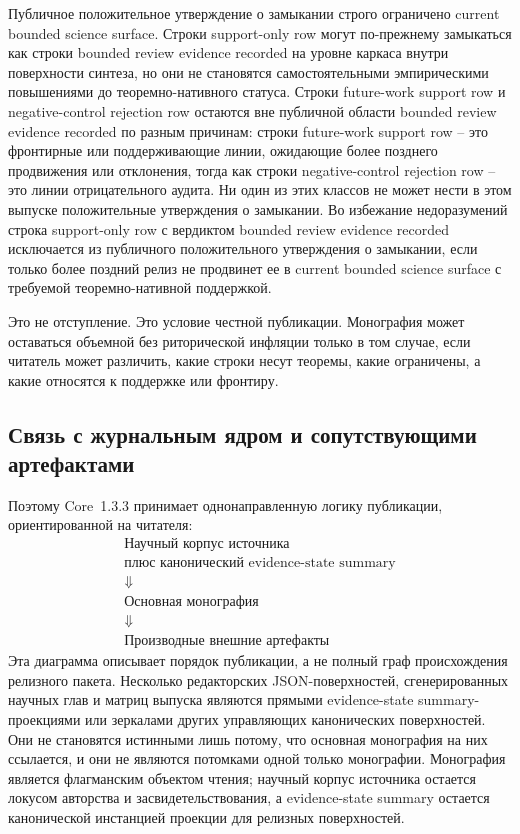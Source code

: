 Публичное положительное утверждение о замыкании строго ограничено
current bounded science surface. Строки support-only row могут по-прежнему
замыкаться как строки bounded review evidence recorded на уровне каркаса внутри поверхности синтеза, но
они не становятся самостоятельными эмпирическими повышениями до
теоремно-нативного статуса. Строки future-work support row и negative-control rejection row
остаются вне публичной области bounded review evidence recorded по разным причинам: строки
future-work support row -- это фронтирные или поддерживающие линии, ожидающие
более позднего продвижения или отклонения, тогда как строки negative-control rejection row
-- это линии отрицательного аудита. Ни один из этих классов не может нести в
этом выпуске положительные утверждения о замыкании.
Во избежание недоразумений строка support-only row с вердиктом
bounded review evidence recorded исключается из публичного положительного утверждения о
замыкании, если только более поздний релиз не продвинет ее в
current bounded science surface с требуемой теоремно-нативной поддержкой.

Это не отступление. Это условие честной публикации. Монография может оставаться
объемной без риторической инфляции только в том случае, если читатель может
различить, какие строки несут теоремы, какие ограничены, а какие относятся к
поддержке или фронтиру.

\subsection{Связь с журнальным ядром и сопутствующими артефактами}

Поэтому Core~1.3.3 принимает однонаправленную логику публикации, ориентированной
на читателя:
\[
\begin{gathered}
\text{Научный корпус источника}\\
\text{плюс канонический evidence-state summary}\\
\Downarrow\\
\text{Основная монография}\\
\Downarrow\\
\text{Производные внешние артефакты}
\end{gathered}
\]
Эта диаграмма описывает порядок публикации, а не полный граф происхождения
релизного пакета. Несколько редакторских JSON-поверхностей, сгенерированных
научных глав и матриц выпуска являются прямыми evidence-state summary-проекциями или зеркалами
других управляющих канонических поверхностей. Они не становятся истинными лишь
потому, что основная монография на них ссылается, и они не являются потомками
одной только монографии. Монография является флагманским объектом чтения;
научный корпус источника остается локусом авторства и засвидетельствования, а
evidence-state summary остается канонической инстанцией проекции для релизных поверхностей.


